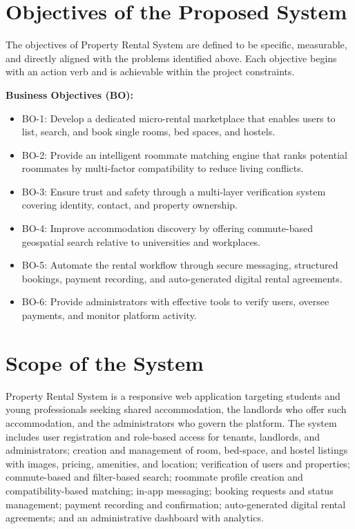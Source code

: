 
\section{Objectives of the Proposed System}

The objectives of Property Rental System are defined to be specific, measurable, and directly aligned with the problems identified above. Each objective begins with an action verb and is achievable within the project constraints.

\vspace{0.3cm}

\textbf{Business Objectives (BO):}

\begin{itemize}
    \item BO-1: Develop a dedicated micro-rental marketplace that enables users to list, search, and book single rooms, bed spaces, and hostels.
    \item BO-2: Provide an intelligent roommate matching engine that ranks potential roommates by multi-factor compatibility to reduce living conflicts.
    \item BO-3: Ensure trust and safety through a multi-layer verification system covering identity, contact, and property ownership.
    \item BO-4: Improve accommodation discovery by offering commute-based geospatial search relative to universities and workplaces.
    \item BO-5: Automate the rental workflow through secure messaging, structured bookings, payment recording, and auto-generated digital rental agreements.
    \item BO-6: Provide administrators with effective tools to verify users, oversee payments, and monitor platform activity.
\end{itemize}


\section{Scope of the System}

Property Rental System is a responsive web application targeting students and young professionals seeking shared accommodation, the landlords who offer such accommodation, and the administrators who govern the platform. The system includes user registration and role-based access for tenants, landlords, and administrators; creation and management of room, bed-space, and hostel listings with images, pricing, amenities, and location; verification of users and properties; commute-based and filter-based search; roommate profile creation and compatibility-based matching; in-app messaging; booking requests and status management; payment recording and confirmation; auto-generated digital rental agreements; and an administrative dashboard with analytics.


